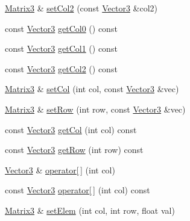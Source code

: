 \begin{DoxyCompactItemize}
\item 
\hyperlink{classVectormath_1_1Aos_1_1Matrix3}{Matrix3} \& \hyperlink{classVectormath_1_1Aos_1_1Matrix3_a13b38774ee1114be7b9e54fc675b005e}{set\-Col2} (const \hyperlink{classVectormath_1_1Aos_1_1Vector3}{Vector3} \&col2)
\item 
const \hyperlink{classVectormath_1_1Aos_1_1Vector3}{Vector3} \hyperlink{classVectormath_1_1Aos_1_1Matrix3_a9210bff3e38bc93a54e727e2a12b9e18}{get\-Col0} () const 
\item 
const \hyperlink{classVectormath_1_1Aos_1_1Vector3}{Vector3} \hyperlink{classVectormath_1_1Aos_1_1Matrix3_ad26bbc279a2cdcbab29172716155dfcf}{get\-Col1} () const 
\item 
const \hyperlink{classVectormath_1_1Aos_1_1Vector3}{Vector3} \hyperlink{classVectormath_1_1Aos_1_1Matrix3_abe2e97ccc608b6fa920d91291f52b9f8}{get\-Col2} () const 
\item 
\hyperlink{classVectormath_1_1Aos_1_1Matrix3}{Matrix3} \& \hyperlink{classVectormath_1_1Aos_1_1Matrix3_ae0f72937c23ebbf984886f00d866275b}{set\-Col} (int col, const \hyperlink{classVectormath_1_1Aos_1_1Vector3}{Vector3} \&vec)
\item 
\hyperlink{classVectormath_1_1Aos_1_1Matrix3}{Matrix3} \& \hyperlink{classVectormath_1_1Aos_1_1Matrix3_ac1a2dfe095be0727f5ea19d4fe050034}{set\-Row} (int row, const \hyperlink{classVectormath_1_1Aos_1_1Vector3}{Vector3} \&vec)
\item 
const \hyperlink{classVectormath_1_1Aos_1_1Vector3}{Vector3} \hyperlink{classVectormath_1_1Aos_1_1Matrix3_a8ab9891333f2a05a230bb3eb9f8c8a5b}{get\-Col} (int col) const 
\item 
const \hyperlink{classVectormath_1_1Aos_1_1Vector3}{Vector3} \hyperlink{classVectormath_1_1Aos_1_1Matrix3_a5c2ccad6954531f4a78df7155ce7fa6c}{get\-Row} (int row) const 
\item 
\hyperlink{classVectormath_1_1Aos_1_1Vector3}{Vector3} \& \hyperlink{classVectormath_1_1Aos_1_1Matrix3_abdd0656a3f6405c7c4e9d771d26d367c}{operator\mbox{[}$\,$\mbox{]}} (int col)
\item 
const \hyperlink{classVectormath_1_1Aos_1_1Vector3}{Vector3} \hyperlink{classVectormath_1_1Aos_1_1Matrix3_ad25fe8d2b875655586c7ccabd2046aa3}{operator\mbox{[}$\,$\mbox{]}} (int col) const 
\item 
\hyperlink{classVectormath_1_1Aos_1_1Matrix3}{Matrix3} \& \hyperlink{classVectormath_1_1Aos_1_1Matrix3_a0a6d01249738844b04abc3031f836693}{set\-Elem} (int col, int row, float val)
\item 

\end{DoxyCompactItemize}
